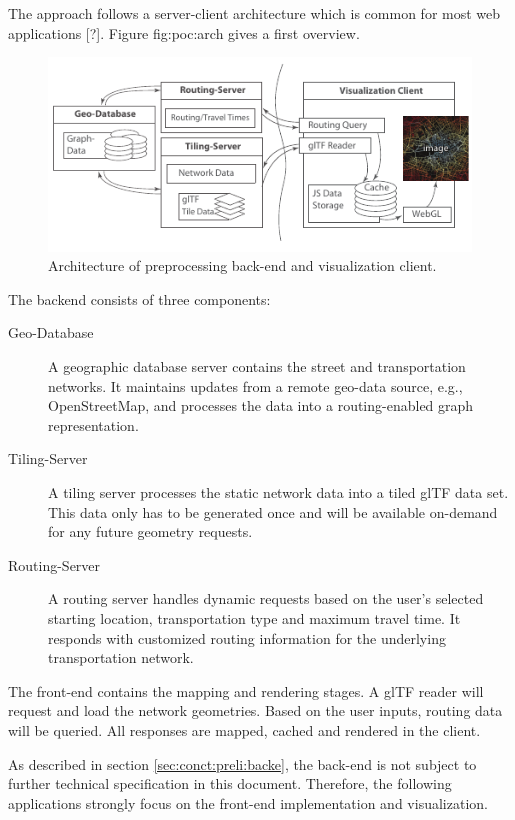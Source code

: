     The approach follows a server-client architecture which is common for most web applications [?]. Figure {fig:poc:arch} gives a first overview.\par
    \begin{figure}[h]
      \centering
      \includegraphics[width=\linewidth]{./img/conceptual-overview-bw.pdf}
      \caption{Architecture of preprocessing back-end and visualization client.}
      \label{fig:poc:arch}
    \end{figure}
    The backend consists of three components:
    \begin{description}
      \item[Geo-Database] A geographic database server contains the street and transportation networks. It maintains updates from a remote geo-data source, e.g., OpenStreetMap, and processes the data into a routing-enabled graph representation.
      \item[Tiling-Server] A tiling server processes the static network data into a tiled glTF data set. This data only has to be generated once and will be available on-demand for any future geometry requests.
      \item[Routing-Server] A routing server handles dynamic requests based on the user's selected starting location, transportation type and maximum travel time. It responds with customized routing information for the underlying transportation network.
    \end{description}
    The front-end contains the mapping and rendering stages. A glTF reader will request and load the network geometries. Based on the user inputs, routing data will be queried. All responses are mapped, cached and rendered in the client.\par
    As described in section \ref{sec:conct:preli:backe}, the back-end is not subject to further technical specification in this document. Therefore, the following applications strongly focus on the front-end implementation and visualization.\par
